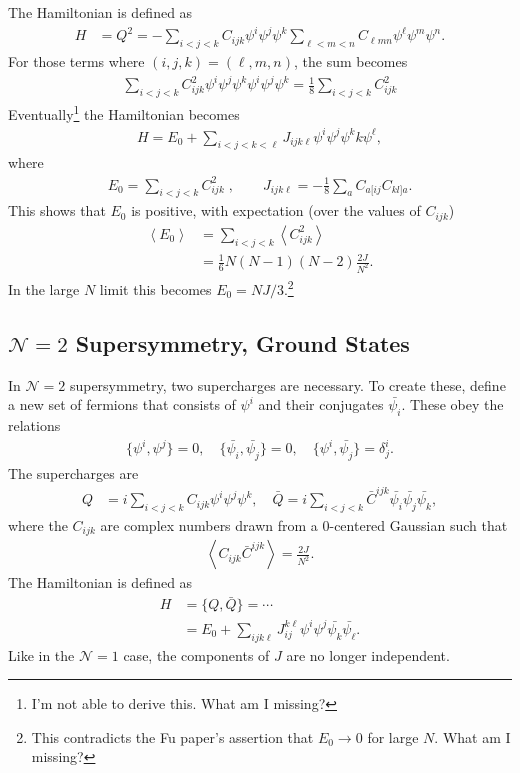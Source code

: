 \documentclass[12pt]{article} %
\renewcommand{\cal}{\mathcal}
\renewcommand{\th}[1]{\frac{1}{#1}}
\newcommand{\ex}[1]{\left\langle #1 \right\rangle}
\renewcommand{\l}{\ell}
\newcommand{\nn}{\nonumber\\}
\begin{document}
The Hamiltonian is defined as
\begin{align}
H &= Q^2 = - \sum_{i<j<k}C_{ijk}\psi^i\psi^j\psi^k\sum_{\l<m<n}C_{\l mn}\psi^\l
	\psi^m\psi^n.
\end{align}
For those terms where $(i,j,k) = (\l,m,n)$, the sum becomes
\begin{align}
\sum_{i<j<k}C_{ijk}^2\psi^i\psi^j\psi^k\psi^i\psi^j\psi^k = \th{8} \sum_{i<j<k}
	C_{ijk}^2 
\end{align}
Eventually\footnote{I'm not able to derive this. What am I missing?} the Hamiltonian becomes
\begin{align}
H = E_0 + \sum_{i<j<k<\l}J_{ijk\l}\psi^i\psi^j\psi^kk\psi^\l, \label{eqn:N1def}
\end{align}
where
\begin{align}
E_0 = \sum_{i<j<k} C_{ijk}^2\;,\qquad J_{ijk\l} = -\th{8}\sum_{a} C_{a[ij}
	C_{kl]a}.
\end{align}
This shows that $E_0$ is positive, with expectation (over the values of $C_{ijk}$)
\begin{align}
\ex{E_0} &= \sum_{i<j<k}\ex{C^2_{ijk}}\nn
&= \th{6}N(N-1)(N-2)\frac{2J}{N^2}.
\end{align}
In the large $N$ limit this becomes $E_0 = NJ/3$.\footnote{This contradicts the Fu paper's assertion that $E_0\to 0$ for large $N$. What am I missing?}

\subsection{$\cal{N}=2$ Supersymmetry, Ground States}\emph{}

In $\cal N=2$ supersymmetry, two supercharges are necessary. To create these, define a new set of fermions that consists of $\psi^i$ and their conjugates $\bar{\psi_i}$. These obey the relations 
\begin{align}
\{\psi^i,\psi^j\} = 0, \quad \{\bar{\psi_i},\bar{\psi_j}\} = 0, \quad
	\{\psi^i,\bar{\psi_j}\} = \delta_j^i. \label{eqn:N2_ant}
\end{align}
The supercharges are 
\begin{align}
Q &= i\sum_{i<j<k}C_{ijk}\psi^i\psi^j\psi^k,\quad
\bar{Q} = i\sum_{i<j<k}\bar C^{ijk}\bar{\psi_i}\bar{\psi_j}\bar{\psi_k},
	\label{eqn:N2charge}
\end{align}
where the $C_{ijk}$ are complex numbers drawn from a 0-centered Gaussian such that
\begin{align}
\ex{C_{ijk}\bar C^{ijk}} = \frac{2J}{N^2}.
\end{align} 
The Hamiltonian is defined as 
\begin{align}
H &= \{Q, \bar Q\} = \cdots\nn
&= E_0 + \sum_{ijk\l}J_{ij}^{k\l}\psi^i\psi^j\bar{\psi_k}\bar{\psi_\l}.
\end{align}
Like in the $\cal N=1$ case, the components of $J$ are no longer independent. 
\end{document}
